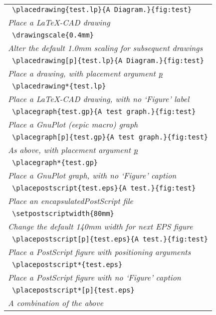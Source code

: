 \documentclass[a4paper]{article}
\begin{document}
\begin{figure}
    \begin{center}
    \begin{tabular}{l}
        \hline
        \verb! \placedrawing{test.lp}{A Diagram.}{fig:test}! \\
            \emph{Place a LaTeX-CAD drawing} \\
            \verb! \drawingscale{0.4mm}! \\
            \emph{Alter the default 1.0mm scaling for subsequent drawings} \\
            \verb! \placedrawing[p]{test.lp}{A Diagram.}{fig:test}! \\
            \emph{Place a drawing, with placement argument \underline{p}} \\
            \verb! \placedrawing*{test.lp}! \\
            \emph{Place a LaTeX-CAD drawing, with no `Figure' label} \\
            \verb! \placegraph{test.gp}{A test graph.}{fig:test}! \\
            \emph{Place a GnuPlot (eepic macro) graph} \\
            \verb! \placegraph[p]{test.gp}{A test graph.}{fig:test}! \\
            \emph{As above, with placement argument \underline{p}} \\
            \verb! \placegraph*{test.gp}!   \\
            \emph{Place a GnuPlot graph, with no `Figure' caption} \\
            \verb! \placepostscript{test.eps}{A test.}{fig:test}! \\
            \emph{Place an encapsulatedPostScript file} \\
            \verb! \setpostscriptwidth{80mm}!       \\
            \emph{Change the default 140mm width for next EPS figure }\\
            \verb! \placepostscript[p]{test.eps}{A test.}{fig:test}! \\
            \emph{Place a PostScript figure with positioning arguments} \\
            \verb! \placepostscript*{test.eps}! \\
            \emph{Place a PostScript figure with no `Figure' caption} \\
            \verb! \placepostscript*[p]{test.eps}! \\
            \emph{A combination of the above} \\

\end{tabular}
\end{center}
\end{figure}
\end{document}
